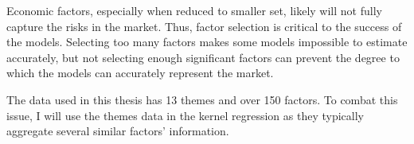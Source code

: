 Economic factors, especially when reduced to smaller set, likely will not fully capture the risks in the market. Thus, factor selection is critical to the success of the models. Selecting too many factors makes some models impossible to estimate accurately, but not selecting enough significant factors can prevent the degree to which the models can accurately represent the market.

The data used in this thesis has 13 themes and over 150 factors. To combat this issue, I will use the themes data in the kernel regression as they typically aggregate several similar factors' information.